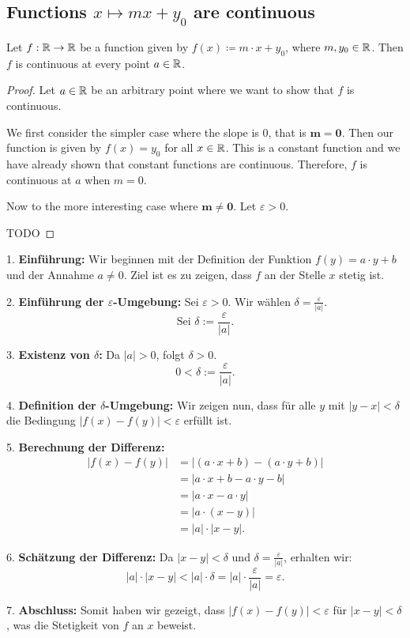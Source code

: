 \subsection{Functions $x \mapsto mx + y_0$ are continuous}

\begin{theorem}
   Let $f: \mathbb{R} \to \mathbb{R}$ be a function given by $f(x) \coloneqq m \cdot x + y_0$, where $m, y_0 \in \mathbb{R}$. Then $f$ is continuous at every point $a \in \mathbb{R}$.
\end{theorem}

\begin{proof}
   Let $a \in \mathbb{R}$ be an arbitrary point where we want to show that $f$ is continuous.

   We first consider the simpler case where the slope is $0$, that is $\mathbf{m = 0}$. Then our function is given by $f(x) = y_0$ for all $x \in \mathbb{R}$. This is a constant function and we have already shown that constant functions are continuous. Therefore, $f$ is continuous at $a$ when $m = 0$.

   Now to the more interesting case where $\mathbf{m \neq 0}$. Let $\varepsilon > 0$.

   TODO
\end{proof}

\vspace{1cm}


1. \textbf{Einführung:}
   Wir beginnen mit der Definition der Funktion $f(y) = a \cdot y + b$ und der Annahme $a \neq 0$. Ziel ist es zu zeigen, dass $f$ an der Stelle $x$ stetig ist. 

2. \textbf{Einführung der $\varepsilon$-Umgebung:}
   Sei $\varepsilon > 0$. Wir wählen $\delta = \frac{\varepsilon}{|a|}$.
   \[
   \text{Sei } \delta := \frac{\varepsilon}{|a|}.
   \]

3. \textbf{Existenz von $\delta$:}
   Da $|a| > 0$, folgt $\delta > 0$.
   \[
   0 < \delta := \frac{\varepsilon}{|a|}.
   \]

4. \textbf{Definition der $\delta$-Umgebung:}
   Wir zeigen nun, dass für alle $y$ mit $|y - x| < \delta$ die Bedingung $|f(x) - f(y)| < \varepsilon$ erfüllt ist. 

5. \textbf{Berechnung der Differenz:}
   \begin{align*}
   |f(x) - f(y)| &= |(a \cdot x + b) - (a \cdot y + b)| \\
   &= |a \cdot x + b - a \cdot y - b| \\
   &= |a \cdot x - a \cdot y| \\
   &= |a \cdot (x - y)| \\
   &= |a| \cdot |x - y|.
   \end{align*}

6. \textbf{Schätzung der Differenz:}
   Da $|x - y| < \delta$ und $\delta = \frac{\varepsilon}{|a|}$, erhalten wir:
   \[
   |a| \cdot |x - y| < |a| \cdot \delta = |a| \cdot \frac{\varepsilon}{|a|} = \varepsilon.
   \]

7. \textbf{Abschluss:}
   Somit haben wir gezeigt, dass $|f(x) - f(y)| < \varepsilon$ für $|x - y| < \delta$, was die Stetigkeit von $f$ an $x$ beweist.
